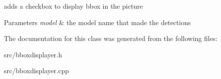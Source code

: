 adds a checkbox to display bbox in the picture 


\begin{DoxyParams}{Parameters}
{\em model} & the model name that made the detections \\
\hline
\end{DoxyParams}


The documentation for this class was generated from the following files\+:\begin{DoxyCompactItemize}
\item 
src/bboxdisplayer.\+h\item 
src/bboxdisplayer.\+cpp\end{DoxyCompactItemize}
